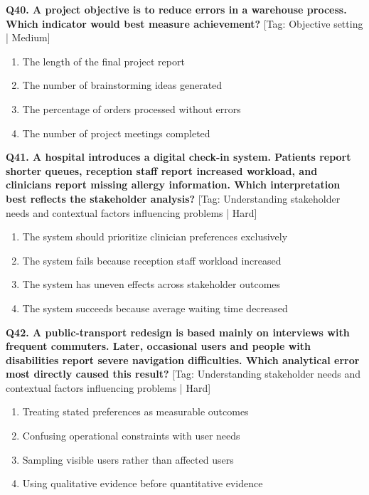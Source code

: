 \noindent\textbf{Q40. A project objective is to reduce errors in a warehouse process. Which indicator would best measure achievement?} \hfill [Tag: Objective setting | Medium]
\begin{enumerate}[label=(\alph*),topsep=2pt,itemsep=1pt,partopsep=0pt,parsep=0pt]
    \item {The length of the final project report}
    \item {The number of brainstorming ideas generated}
    \item {The percentage of orders processed without errors}
    \item {The number of project meetings completed}
\end{enumerate}
\vspace{2mm}

\noindent\textbf{Q41. A hospital introduces a digital check-in system. Patients report shorter queues, reception staff report increased workload, and clinicians report missing allergy information. Which interpretation best reflects the stakeholder analysis?} \hfill [Tag: Understanding stakeholder needs and contextual factors influencing problems | Hard]
\begin{enumerate}[label=(\alph*),topsep=2pt,itemsep=1pt,partopsep=0pt,parsep=0pt]
    \item {The system should prioritize clinician preferences exclusively}
    \item {The system fails because reception staff workload increased}
    \item {The system has uneven effects across stakeholder outcomes}
    \item {The system succeeds because average waiting time decreased}
\end{enumerate}
\vspace{2mm}

\noindent\textbf{Q42. A public-transport redesign is based mainly on interviews with frequent commuters. Later, occasional users and people with disabilities report severe navigation difficulties. Which analytical error most directly caused this result?} \hfill [Tag: Understanding stakeholder needs and contextual factors influencing problems | Hard]
\begin{enumerate}[label=(\alph*),topsep=2pt,itemsep=1pt,partopsep=0pt,parsep=0pt]
    \item {Treating stated preferences as measurable outcomes}
    \item {Confusing operational constraints with user needs}
    \item {Sampling visible users rather than affected users}
    \item {Using qualitative evidence before quantitative evidence}
\end{enumerate}
\vspace{2mm}

